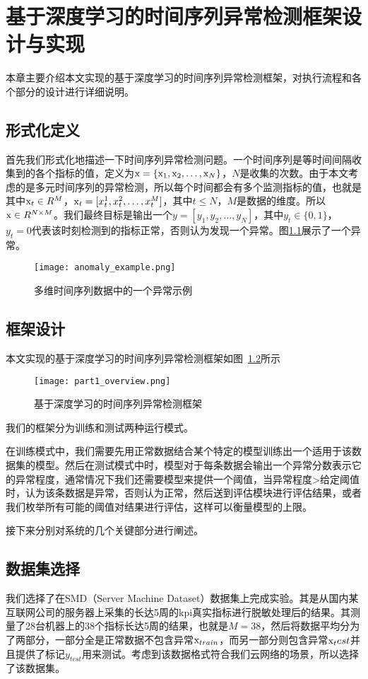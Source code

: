 
\chapter{基于深度学习的时间序列异常检测框架设计与实现}
\label{cha:intro}
本章主要介绍本文实现的基于深度学习的时间序列异常检测框架，对执行流程和各个部分的设计进行详细说明。
\section{形式化定义}
首先我们形式化地描述一下时间序列异常检测问题。一个时间序列是等时间间隔收集到的各个指标的值，定义为${\rm x}=\{{\rm x}_1,{\rm x}_2,\dots,{\rm x}_N\}$，$N$是收集的次数。由于本文考虑的是多元时间序列的异常检测，所以每个时间都会有多个监测指标的值，也就是其中${\rm x}_t\in R^M$，${\rm x}_t=[x_t^1,x_t^2,\dots,x_t^M]$，其中$t\leq N$，$M$是数据的维度。所以${\rm x}\in R^{N\times M}$。我们最终目标是输出一个$y=[y_1, y_2,\dots, y_N ]$，其中$y_t\in \{0,1\}$，$y_t=0$代表该时刻检测到的指标正常，否则认为发现一个异常。图\ref{fig:anomaly_example}展示了一个异常。
\begin{figure}[htbp]
  \centering
  \texttt{[image: anomaly\_example.png]}
  \caption{多维时间序列数据中的一个异常示例}
  \label{fig:anomaly_example}
\end{figure}

\section{框架设计}
本文实现的基于深度学习的时间序列异常检测框架如图~\ref{fig:part1_overview}所示

\begin{figure}[htbp]
    \centering
    \texttt{[image: part1\_overview.png]}
    \caption{基于深度学习的时间序列异常检测框架}
    \label{fig:part1_overview}
  \end{figure}

我们的框架分为训练和测试两种运行模式。

在训练模式中，我们需要先用正常数据结合某个特定的模型训练出一个适用于该数据集的模型。然后在测试模式中时，模型对于每条数据会输出一个异常分数表示它的异常程度，通常情况下我们还需要模型来提供一个阈值，当异常程度>给定阈值时，认为该条数据是异常，否则认为正常，然后送到评估模块进行评估结果，或者我们枚举所有可能的阈值对结果进行评估，这样可以衡量模型的上限。

接下来分别对系统的几个关键部分进行阐述。

\section{数据集选择}
我们选择了在SMD（Server Machine Dataset）\cite{su2019robust}数据集上完成实验。其是从国内某互联网公司的服务器上采集的长达5周的kpi真实指标进行脱敏处理后的结果。其测量了28台机器上的38个指标长达5周的结果，也就是$M=38$，然后将数据平均分为了两部分，一部分全是正常数据不包含异常${\rm x}_{train}$，而另一部分则包含异常${\rm x}_test$并且提供了标记$y_{test}$用来测试。考虑到该数据格式符合我们云网络的场景，所以选择了该数据集。

